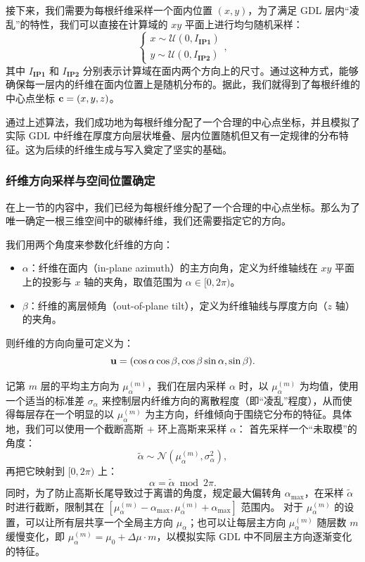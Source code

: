 接下来，我们需要为每根纤维采样一个面内位置 $(x,y)$，为了满足 GDL 层内“凌乱”的特性，我们可以直接在计算域的 $xy$ 平面上进行均匀随机采样：
\begin{equation}  
\begin{cases}
x \sim \mathcal{U}(0, I_{\textbf{IP1}}) \\
y \sim \mathcal{U}(0, I_{\textbf{IP2}})
\end{cases}
,
\end{equation}
其中 $I_{\textbf{IP1}}$ 和 $I_{\textbf{IP2}}$ 分别表示计算域在面内两个方向上的尺寸。通过这种方式，能够确保每一层内的纤维在面内位置上是随机分布的。据此，我们就得到了每根纤维的中心点坐标 $\textbf c = (x,y,z)$。

通过上述算法，我们成功地为每根纤维分配了一个合理的中心点坐标，并且模拟了实际 GDL 中纤维在厚度方向层状堆叠、层内位置随机但又有一定规律的分布特征。这为后续的纤维生成与写入奠定了坚实的基础。

\subsubsection{\textbf{纤维方向采样与空间位置确定}}

在上一节的内容中，我们已经为每根纤维分配了一个合理的中心点坐标。那么为了唯一确定一根三维空间中的碳棒纤维，我们还需要指定它的方向。

我们用两个角度来参数化纤维的方向\cite{el2014stochastic}：
\begin{itemize}
\item $\alpha$：纤维在面内（in-plane azimuth）的主方向角，定义为纤维轴线在 $xy$ 平面上的投影与 $x$ 轴的夹角，取值范围为 $\alpha \in [0,2 \pi)$。
\item $\beta$：纤维的离层倾角（out-of-plane tilt），定义为纤维轴线与厚度方向（$z$ 轴）的夹角。
\end{itemize}
则纤维的方向向量可定义为：
\begin{equation}
\textbf u = (\cos\alpha \cos\beta, \cos\beta \sin\alpha, \sin\beta).
\end{equation}

记第 $m$ 层的平均主方向为 $\mu_{\alpha}^{(m)}$，我们在层内采样 $\alpha$ 时，以 $\mu_{\alpha}^{(m)}$ 为均值，使用一个适当的标准差 $\sigma_\alpha$ 来控制层内纤维方向的离散程度（即“凌乱”程度），从而使得每层存在一个明显的以 $\mu_{\alpha}^{(m)}$ 为主方向，纤维倾向于围绕它分布的特征。具体地，我们可以使用一个截断高斯 + 环上高斯来采样 $\alpha$：
首先采样一个“未取模”的角度：
\begin{equation}
\tilde\alpha \sim \mathcal{N}(\mu_{\alpha}^{(m)}, \sigma_\alpha^2),
\end{equation}
再把它映射到 $[0,2\pi)$ 上：
\begin{equation}
\alpha = \tilde\alpha \bmod 2\pi.
\end{equation}
同时，为了防止高斯长尾导致过于离谱的角度，规定最大偏转角 $\alpha_{\max}$，在采样 $\tilde\alpha$ 时进行截断，限制其在 $[\mu_{\alpha}^{(m)} - \alpha_{\max}, \mu_{\alpha}^{(m)} + \alpha_{\max}]$ 范围内。
对于 $\mu_{\alpha}^{(m)}$ 的设置，可以让所有层共享一个全局主方向 $\mu_{\alpha}$；也可以让每层主方向 $\mu_{\alpha}^{(m)}$ 随层数 $m$ 缓慢变化，即 $\mu_{\alpha}^{(m)} = \mu_0 + \Delta\mu \cdot m$，以模拟实际 GDL 中不同层主方向逐渐变化的特征。

